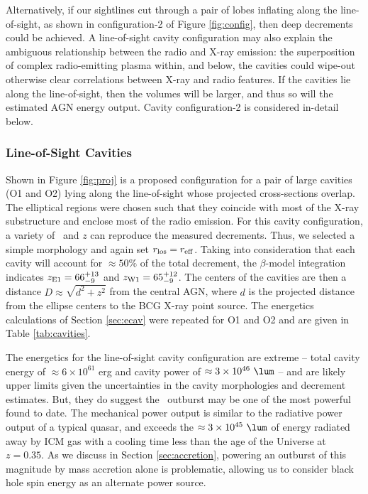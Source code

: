 \documentclass[iop]{emulateapj}
\begin{document}
Alternatively, if our sightlines cut through a pair of lobes inflating
along the line-of-sight, as shown in configuration-2 of Figure
\ref{fig:config}, then deep decrements could be achieved. A
line-of-sight cavity configuration may also explain the ambiguous
relationship between the radio and X-ray emission: the superposition
of complex radio-emitting plasma within, and below, the cavities could
wipe-out otherwise clear correlations between X-ray and radio
features. If the cavities lie along the line-of-sight, then the
volumes will be larger, and thus so will the estimated AGN energy
output. Cavity configuration-2 is considered in-detail below.

\subsubsection{Line-of-Sight Cavities}

Shown in Figure \ref{fig:proj} is a proposed configuration for a pair
of large cavities (O1 and O2) lying along the line-of-sight whose
projected cross-sections overlap. The elliptical regions were chosen
such that they coincide with most of the X-ray substructure and
enclose most of the radio emission. For this cavity configuration, a
variety of \rlos\ and $z$ can reproduce the measured decrements. Thus,
we selected a simple morphology and again set $r_{\rm{los}} = r_{\rm{eff}}$. Taking
into consideration that each cavity will account for $\approx 50\%$ of
the total decrement, the $\beta$-model integration indicates
$z_{\rm{E1}} = 66^{+13}_{-9}$ and $z_{\rm{W1}} = 65^{+12}_{-9}$. The
centers of the cavities are then a distance $D \approx \sqrt{d^2+z^2}$
from the central AGN, where $d$ is the projected distance from the
ellipse centers to the BCG X-ray point source. The energetics
calculations of Section \ref{sec:ecav} were repeated for O1 and O2 and
are given in Table \ref{tab:cavities}.

The energetics for the line-of-sight cavity configuration are extreme
-- total cavity energy of $\approx 6 \times 10^{61}$ erg and cavity
power of $\approx 3 \times 10^{46} ~\lum$ -- and are likely upper
limits given the uncertainties in the cavity morphologies and
decrement estimates. But, they do suggest the \rbs\ outburst may be
one of the most powerful found to date. The mechanical power output is
similar to the radiative power output of a typical quasar, and exceeds
the $\approx 3 \times 10^{45} ~\lum$ of energy radiated away by ICM
gas with a cooling time less than the age of the Universe at
$z=0.35$. As we discuss in Section \ref{sec:accretion}, powering an
outburst of this magnitude by mass accretion alone is problematic,
allowing us to consider black hole spin energy as an alternate power
source.
\end{document}
